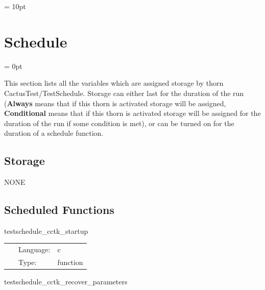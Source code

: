 \vspace{5mm}\parskip = 10pt 

\section{Schedule} 


\parskip = 0pt


\noindent This section lists all the variables which are assigned storage by thorn CactusTest/TestSchedule.  Storage can either last for the duration of the run ({\bf Always} means that if this thorn is activated storage will be assigned, {\bf Conditional} means that if this thorn is activated storage will be assigned for the duration of the run if some condition is met), or can be turned on for the duration of a schedule function.


\subsection*{Storage}NONE
\subsection*{Scheduled Functions}
\vspace{5mm}


\hspace{5mm} testschedule\_cctk\_startup 

\hspace{5mm}{\it test to see if function is placed in schedule and run at cctk\_startup } 


\hspace{5mm}

 \begin{tabular*}{160mm}{cll} 
~ & Language:  & c \\ 
~ & Type:  & function \\ 
\end{tabular*} 


\vspace{5mm}


\hspace{5mm} testschedule\_cctk\_recover\_parameters 

\hspace{5mm}{\it test to see if function is placed in schedule and run at cctk\_recover\_parameters } 


\hspace{5mm}

